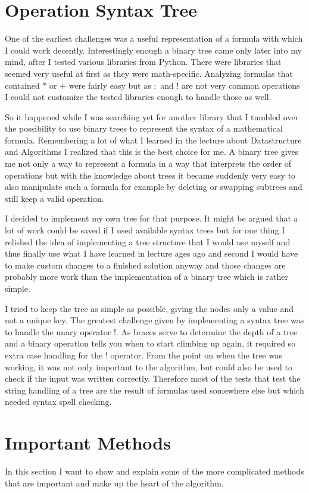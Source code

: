 \section{Operation Syntax Tree}
One of the earliest challenges was a useful representation of a formula with which I could work decently. Interestingly enough a binary tree came only later into my mind, after I tested various libraries from Python. There were libraries that seemed very useful at first as they were math-specific. Analyzing formulas that contained $*$ or $+$ were fairly easy but as $:$ and $!$ are not very common operations I could not customize the tested libraries enough to handle those as well.

So it happened while I was searching yet for another library that I tumbled over the possibility to use binary trees to represent the syntax of a mathematical formula. Remembering a lot of what I learned in the lecture about Datastructure and Algorithms I realized that this is the best choice for me. A binary tree gives me not only a way to represent a formula in a way that interprets the order of operations but with the knowledge about trees it became suddenly very easy to also manipulate such a formula for example by deleting or swapping subtrees and still keep a valid operation. 

I decided to implement my own tree for that purpose. It might be argued that a lot of work could be saved if I used available syntax trees but for one thing I relished the idea of implementing a tree structure that I would use myself and thus finally use what I have learned in lecture ages ago and second I would have to make custom changes to a finished solution anyway and those changes are probably more work than the implementation of a binary tree which is rather simple.

I tried to keep the tree as simple as possible, giving the nodes only a value and not a unique key. The greatest challenge given by implementing a syntax tree was to handle the unary operator $!$. As braces serve to determine the depth of a tree and a binary operation tells you when to start climbing up again, it required so extra case handling for the $!$ operator. From the point on when the tree was working, it was not only important to the algorithm, but could also be used to check if the input was written correctly. Therefore most of the tests that test the string handling of a tree are the result of formulas used somewhere else but which needed syntax spell checking. 


\section{Important Methods}
In this section I want to show and explain some of the more complicated methods that are important and make up the heart of the algorithm.

